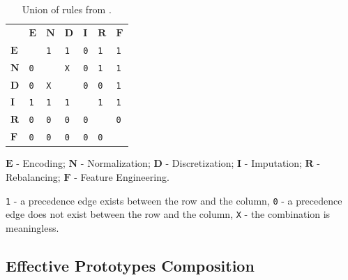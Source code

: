 \begin{table}[!t]
	\caption{
		Union of rules from .
	}
	\renewcommand{\arraystretch}{0.3}
	\footnotesize
	\centering
	\label{effective-tbl:rules-union}
	\begin{threeparttable}
		\begin{tabular}{p{1cm}p{1cm}p{1cm}p{1cm}p{1cm}p{1cm}p{1cm}}
			\toprule
			& $\boldsymbol{E}$ & $\boldsymbol{N}$ & $\boldsymbol{D}$ & $\boldsymbol{I}$ & $\boldsymbol{R}$ & $\boldsymbol{F}$
			\\	\cmidrule[.1em]{1-7}
			$\boldsymbol{E}$ & \cellcolor{gray!25} & \texttt{1} & \texttt{1} & \texttt{0} & \texttt{1} & \texttt{1} \\	\cmidrule[.1em]{1-7}
			$\boldsymbol{N}$ & \texttt{0} & \cellcolor{gray!25}  & \texttt{X} & \texttt{0} & \texttt{1} & \texttt{1} \\	\cmidrule[.1em]{1-7}
			$\boldsymbol{D}$ & \texttt{0} & \texttt{X} & \cellcolor{gray!25} & \texttt{0} & \texttt{0} & \texttt{1} \\	\cmidrule[.1em]{1-7}
			$\boldsymbol{I}$ & \texttt{1} & \texttt{1} & \texttt{1} & \cellcolor{gray!25}  & \texttt{1} & \texttt{1} \\	\cmidrule[.1em]{1-7}
			$\boldsymbol{R}$ & \texttt{0} & \texttt{0} & \texttt{0} & \texttt{0} & \cellcolor{gray!25}  & \texttt{0} \\	\cmidrule[.1em]{1-7}
			$\boldsymbol{F}$ & \texttt{0} & \texttt{0} & \texttt{0} & \texttt{0} & \texttt{0} & \cellcolor{gray!25} \\	\cmidrule[.1em]{1-7}
		\end{tabular}
		\begin{tablenotes}
			\scriptsize
			\item$\boldsymbol{E}$ - Encoding; $\boldsymbol{N}$ - Normalization; $\boldsymbol{D}$ - Discretization; $\boldsymbol{I}$ - Imputation; $\boldsymbol{R}$ - Rebalancing; $\boldsymbol{F}$ - Feature Engineering. \item \texttt{1} - a precedence edge exists between the row and the column, \texttt{0} - a precedence edge does not exist between the row and the column, \texttt{X} - the combination is meaningless.
		\end{tablenotes}
	\end{threeparttable}
\end{table}

\subsection{Effective Prototypes Composition}
\label{effective-ssec:composition}

